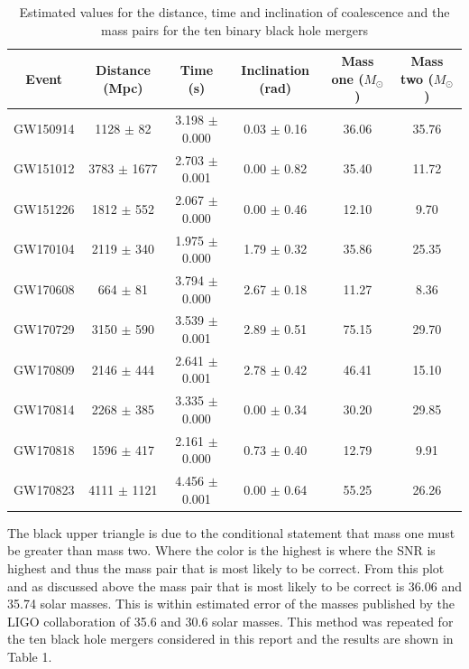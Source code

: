 \documentclass{article}
\begin{document}
\begin{table}[h]
    \begin{center}
        \caption{Estimated values for the distance, time and inclination of coalescence and the mass pairs for the ten binary black hole mergers}
        \label{tab:estimates}
        \begin{tabular}{|c c c c c c|}
            \hline
            Event & Distance (Mpc) & Time (s) & Inclination (rad) & Mass one ($M_{\odot}$) & Mass two ($M_{\odot}$)\\
            \hline
            GW150914 & 1128 $\pm$ 82 & 3.198 $\pm$ 0.000 & 0.03 $\pm$ 0.16 & 36.06 & 35.76 \\
            GW151012 & 3783 $\pm$ 1677 & 2.703 $\pm$ 0.001 & 0.00 $\pm$ 0.82 & 35.40 & 11.72 \\
            GW151226 & 1812 $\pm$ 552 & 2.067 $\pm$ 0.000 & 0.00 $\pm$ 0.46 & 12.10 & 9.70 \\
            GW170104 & 2119 $\pm$ 340 & 1.975 $\pm$ 0.000 & 1.79 $\pm$ 0.32 & 35.86 & 25.35 \\
            GW170608 & 664 $\pm$ 81 & 3.794 $\pm$ 0.000 & 2.67 $\pm$ 0.18 & 11.27 & 8.36 \\
            GW170729 & 3150 $\pm$ 590 & 3.539 $\pm$ 0.001 & 2.89 $\pm$ 0.51 & 75.15 & 29.70 \\
            GW170809 & 2146 $\pm$ 444 & 2.641 $\pm$ 0.001 & 2.78 $\pm$ 0.42 & 46.41 & 15.10 \\
            GW170814 & 2268 $\pm$ 385 & 3.335 $\pm$ 0.000 & 0.00 $\pm$ 0.34 & 30.20 & 29.85 \\
            GW170818 & 1596 $\pm$ 417 & 2.161 $\pm$ 0.000 & 0.73 $\pm$ 0.40 & 12.79 & 9.91 \\
            GW170823 & 4111 $\pm$ 1121 & 4.456 $\pm$ 0.001 & 0.00 $\pm$ 0.64 & 55.25 & 26.26 \\
            \hline
        \end{tabular}

    \end{center}
\end{table}

The black upper triangle is due to the conditional statement that mass one must be greater than mass two. Where the
color is the highest is where the SNR is highest and thus the mass pair that is most likely
to be correct. From this plot and as discussed above the mass pair that is most likely to
be correct is 36.06 and 35.74 solar masses. This is within estimated error of the masses published
by the LIGO collaboration of 35.6 and 30.6 solar masses. This method was repeated for the ten
black hole mergers considered in this report and the results are shown in Table 1.
\end{document}

